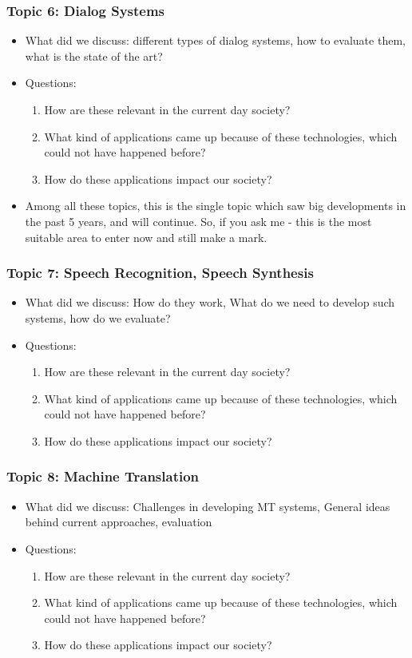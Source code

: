 \documentclass{beamer}
\begin{document}
\begin{frame}
\frametitle{Topic 6: Dialog Systems}
\begin{itemize}
\item What did we discuss: different types of dialog systems, how to evaluate them, what is the state of the art? 
\item Questions:
\begin{enumerate}
\item How are these relevant in the current day society?
\item What kind of applications came up because of these technologies, which could not have happened before?
\item How do these applications impact our society? 
\end{enumerate} 

\pause \item Among all these topics, this is the single topic which saw big developments in the past 5 years, and will continue. So, if you ask me - this is the most suitable area to enter now and still make a mark. 
\end{itemize}
\end{frame}

\begin{frame}
\frametitle{Topic 7: Speech Recognition, Speech Synthesis}
\begin{itemize}
\item What did we discuss:  How do they work, What do we need to develop such systems, how do we evaluate?
\item Questions:
\begin{enumerate}
\item How are these relevant in the current day society?
\item What kind of applications came up because of these technologies, which could not have happened before?
\item How do these applications impact our society? 
\end{enumerate}
\end{itemize}
\end{frame}

\begin{frame}
\frametitle{Topic 8: Machine Translation}
\begin{itemize}
\item What did we discuss:  Challenges in developing MT systems, General ideas behind current approaches, evaluation
\item Questions:
\begin{enumerate}
\item How are these relevant in the current day society?
\item What kind of applications came up because of these technologies, which could not have happened before?
\item How do these applications impact our society? 
\end{enumerate}
\end{itemize}
\end{frame}
\end{document}
